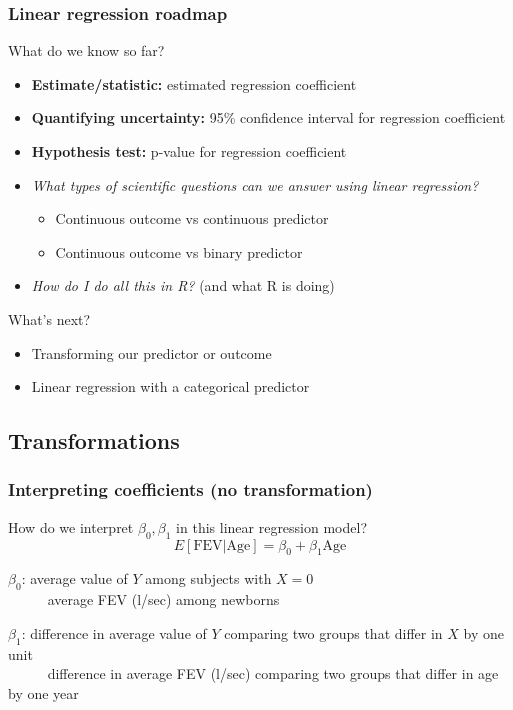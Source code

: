 \documentclass[12pt, 
hyperref={colorlinks=true, linkcolor=blue, urlcolor=cyan},dvipsnames]{beamer}
\begin{document}
\begin{frame}
\frametitle{Linear regression roadmap}
\color{blue} What do we know so far? \color{black}\vspace{-0.3cm}%
\begin{itemize}
\item \textbf{Estimate/statistic:} estimated regression coefficient
\item \textbf{Quantifying uncertainty:} 95\% confidence interval for regression coefficient
\item \textbf{Hypothesis test:} p-value for regression coefficient 
\item \textit{What types of scientific questions can we answer using linear regression?}
	\begin{itemize}
	\item Continuous outcome vs continuous predictor
	\item Continuous outcome vs binary predictor
	\end{itemize}
\item \textit{How do I do all this in R?} (and what R is doing)
\end{itemize}

\color{blue} What's next?\vspace{-0.3cm}
\begin{itemize}
\item Transforming our predictor or outcome
\item Linear regression with a categorical predictor
\end{itemize}
\end{frame}

\subsection{Transformations}
\begin{frame}
\frametitle{Interpreting coefficients (no transformation)}
How do we interpret $\beta_0, \beta_1$ in this linear regression model? $$E[\text{FEV}|\text{Age}] = \beta_0 + \beta_1 \text{Age}$$

$\beta_0$: average value of $Y$ among subjects with $X = 0$ \\ \pause
\ \ \ \ \ \color{blue} average FEV (l/sec) among newborns \color{black} \pause

$\beta_1$: difference in average value of $Y$ comparing two groups that differ in $X$ by one unit\\ \pause
\ \ \ \ \ \color{blue} difference in average FEV (l/sec) comparing two groups that differ in age by one year 
\end{frame}
\end{document}
